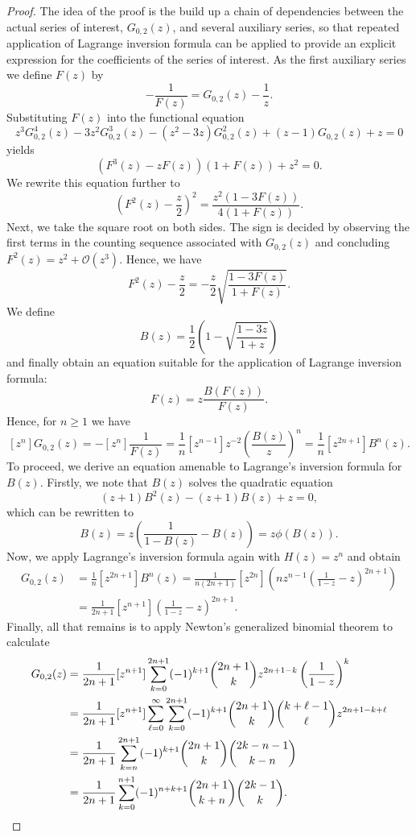 \begin{proof}
  The idea of the proof is the build up a chain of dependencies between the actual series of interest, $G_{0,2}(z)$, and several auxiliary series, so that repeated application of Lagrange inversion formula can be applied to provide an explicit expression for the coefficients of the series of interest.
  As the first auxiliary series we define $F(z)$ by
  $$
    -\frac{1}{F(z)} = G_{0,2}(z) - \frac{1}{z}.
  $$
  Substituting $F(z)$ into the functional equation
  $$
    z^{3}G_{0,2}^{4}(z) - 3z^{2}G_{0,2}^{3}(z) -(z^{2}-3z)G_{0,2}^{2}(z) + (z-1)G_{0,2}(z) + z = 0
  $$
  yields
  $$
    (F^{3}(z) - zF(z))(1+F(z)) + z^{2} = 0.
  $$
  We rewrite this equation further to
  $$
    \left(F^{2}(z) - \frac{z}{2}\right)^{2} = 
    \frac{z^{2}(1-3F(z))}{4(1+F(z))}. 
  $$
  Next, we take the square root on both sides. The sign is decided by observing the first terms in the counting sequence associated with $G_{0,2}(z)$ and concluding $F^{2}(z) = z^{2} + \mathcal{O}(z^{3})$. Hence, we have
  $$
    F^{2}(z) - \frac{z}{2} = -\frac{z}{2}\sqrt{\frac{1-3F(z)}{1+F(z)}}.
  $$
  We define
  $$
    B(z) = \frac{1}{2}\left(1 - \sqrt{\frac{1-3z}{1+z}}\right)
  $$
  and finally obtain an equation suitable for the application of Lagrange inversion formula:
  $$
    F(z) = z \frac{B(F(z))}{F(z)}.
  $$
  Hence, for $n \geq 1$ we have
  $$
    [z^{n}]G_{0,2}(z) = -[z^{n}] \frac{1}{F(z)} = 
    \frac{1}{n}[z^{n-1}]z^{-2}\left(\frac{B(z)}{z}\right)^{n} = 
    \frac{1}{n}[z^{2n+1}]B^{n}(z).
  $$
  To proceed, we derive an equation amenable to Lagrange's inversion formula for $B(z)$. Firstly, we note that $B(z)$ solves the quadratic equation
  $$
  (z+1)B^{2}(z) - (z+1)B(z) + z = 0,
  $$
  which can be rewritten to
  $$
  B(z) = z\left(\frac{1}{1-B(z)} - B(z)\right) = z \phi(B(z)).
  $$
  Now, we apply Lagrange's inversion formula again with $H(z) = z^{n}$ and obtain
  \begin{align*}
    [z^{n}]G_{0,2}(z) &= \frac{1}{n}[z^{2n+1}]B^{n}(z)
    = \frac{1}{n(2n+1)}[z^{2n}]\left(n z^{n-1}\left(\frac{1}{1-z} - z\right)^{2n+1}\right) \\
    &= \frac{1}{2n+1}[z^{n+1}]\left(\frac{1}{1-z} - z\right)^{2n+1}.
  \end{align*}
  Finally, all that remains is to apply Newton's generalized binomial theorem to calculate
  \begin{align*}
    [z^{n}]G_{0,2}(z) &= \frac{1}{2n+1}[z^{n+1}]\sum_{k=0}^{2n+1}(-1)^{k+1}\binom{2n+1}{k}z^{2n+1-k}\left(\frac{1}{1-z}\right)^{k} \\
    &= \frac{1}{2n+1}[z^{n+1}]\sum_{\ell=0}^{\infty}\sum_{k=0}^{2n+1}(-1)^{k+1}\binom{2n+1}{k}\binom{k+\ell-1}{\ell}z^{2n+1-k+\ell} \\
    &= \frac{1}{2n+1}\sum_{k=n}^{2n+1}(-1)^{k+1}\binom{2n+1}{k}\binom{2k-n-1}{k-n} \\
    &= \frac{1}{2n+1}\sum_{k=0}^{n+1}(-1)^{n+k+1}\binom{2n+1}{k+n}\binom{2k-1}{k}. \qedhere
  \end{align*}
\end{proof}

